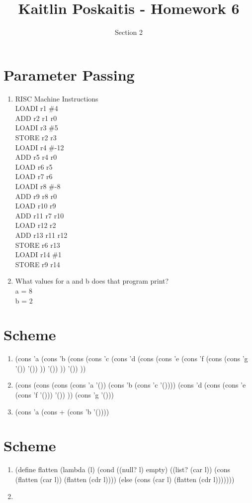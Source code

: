\documentclass[11pt]{article}
\title{\bf Kaitlin Poskaitis - Homework 6}
\author{Section 2}
\date{}
\begin{document}
\maketitle

\section{Parameter Passing}
\begin{enumerate}
	\item RISC Machine Instructions \\
	LOADI r1 \#4\\
	ADD r2 r1 r0\\
	LOADI r3 \#5\\
	STORE r2 r3\\

	LOADI r4 \#-12\\
	ADD r5 r4 r0\\
	LOAD r6 r5\\
	LOAD r7 r6\\
	
	LOADI r8 \#-8\\
	ADD r9 r8 r0\\
	LOAD r10 r9\\

	ADD r11 r7 r10\\
	LOAD r12 r2\\
	ADD r13 r11 r12\\
	STORE r6 r13\\

	LOADI r14 \#1\\
	STORE r9 r14

	\item What values for a and b does that program print?\\
	a = 8\\
	b = 2


\end{enumerate}

\section{Scheme}

\begin{enumerate}
	\item 
	(cons 'a (cons 'b 
		(cons (cons 'c (cons 'd 
			(cons (cons 'e (cons 'f 
				(cons (cons 'g '()) '())
			)) '())
		)) '()) 
	))
	\item
	(cons
		(cons 
			(cons 
				(cons 'a '())
			(cons 'b (cons 'c '())))
		(cons 'd 
			(cons (cons 'e (cons 'f '())) '())	
		))
	(cons 'g '()))
	\item
	(cons 'a (cons + (cons 'b '())))

\end{enumerate}

\section{Scheme}

\begin{enumerate}
	\item
	(define flatten
	 (lambda (l)
	  (cond 
	   ((null? l)
		empty)
	   ((list? (car l))
		(cons (flatten (car l)) (flatten (cdr l))))
	   (else
		(cons (car l) (flatten (cdr l)))))))
	\item 


\end{enumerate}
\end{document}
